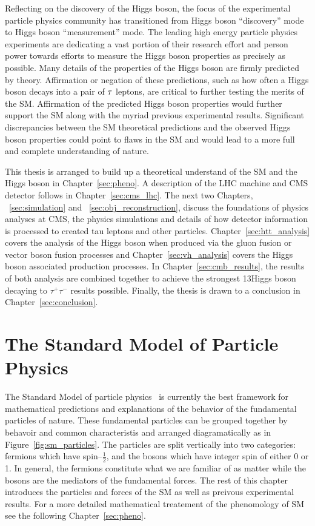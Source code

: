 Reflecting on the discovery of the Higgs boson, the focus of the experimental particle physics community has transitioned from
Higgs boson ``discovery'' mode to Higgs boson ``measurement'' mode. The leading high energy particle physics experiments
are dedicating a vast portion of their research effort and person power towards
efforts to measure the Higgs boson properties as precisely as possible. Many details of the properties of the Higgs
boson are firmly predicted by theory. Affirmation or negation of these predictions,
such as how often a Higgs boson decays into a pair of $\tau$ leptons,
are critical to further testing the merits of the SM. Affirmation of the
predicted Higgs boson properties would further support the SM along with the myriad previous
experimental results. Significant discrepancies between the SM
theoretical predictions and the observed Higgs boson properties could point to
flaws in the SM and would lead to a more full and complete understanding of nature.

This thesis is arranged to build up a theoretical understand of the SM and the
Higgs boson in Chapter~\ref{sec:pheno}. A description of the LHC machine and
CMS detector follows in Chapter~\ref{sec:cms_lhc}. The next two Chapters, ~\ref{sec:simulation} and
~\ref{sec:obj_reconstruction}, discuss the foundations of physics analyses at CMS, the physics
simulations and details of how detector information is processed to created tau
leptons and other particles. Chapter~\ref{sec:htt_analysis} covers the analysis
of the Higgs boson when produced via the gluon fusion or vector boson fusion
processes and Chapter~\ref{sec:vh_analysis} covers the Higgs boson associated
production processes. In Chapter~\ref{sec:cmb_results}, the results of
both analysis are combined together to achieve the strongest 13\TeV Higgs
boson decaying to $\tau^{+}\tau^{-}$ results possible. Finally, the thesis
is drawn to a conclusion in Chapter~\ref{sec:conclusion}.


\section{The Standard Model of Particle Physics}
The Standard Model of particle physics~\cite{Glashow:1961tr,SM1,SM3} is currently
the best framework for mathematical predictions and explanations of the behavior
of the fundamental particles of nature. These fundamental particles can be grouped
together by behavoir and common characteristis and arranged diagramatically as in
Figure~\ref{fig:sm_particles}. The particles are split vertically into two categories:
fermions which have spin--$\frac{1}{2}$, and the bosons which have integer
spin of either 0 or 1. In general, the fermions constitute what we are familiar of
as matter while the bosons are the mediators of the fundamental forces.
The rest of this chapter introduces the particles and forces of the SM as well
as preivous experimental results. For a more detailed mathematical treatement
of the phenomology of SM see the following Chapter~\ref{sec:pheno}.

